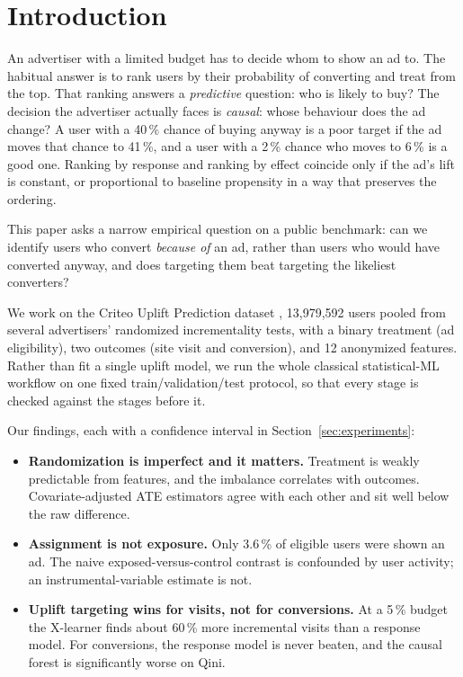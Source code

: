 \section{Introduction}

An advertiser with a limited budget has to decide whom to show an ad to. The
habitual answer is to rank users by their probability of converting and
treat from the top. That ranking answers a \emph{predictive} question: who is
likely to buy? The decision the advertiser actually faces is \emph{causal}:
whose behaviour does the ad change? A user with a 40\,\% chance of buying
anyway is a poor target if the ad moves that chance to 41\,\%, and a user
with a 2\,\% chance who moves to 6\,\% is a good one. Ranking by response and
ranking by effect coincide only if the ad's lift is constant, or
proportional to baseline propensity in a way that preserves the ordering.

This paper asks a narrow empirical question on a public benchmark: can we
identify users who convert \emph{because of} an ad, rather than users who
would have converted anyway, and does targeting them beat targeting the
likeliest converters?

We work on the Criteo Uplift Prediction dataset \cite{diemert2021}, 13,979,592
users pooled from several advertisers' randomized incrementality tests, with
a binary treatment (ad eligibility), two outcomes (site visit and
conversion), and 12 anonymized features. Rather than fit a single uplift
model, we run the whole classical statistical-ML workflow on one fixed
train/validation/test protocol, so that every stage is checked against the
stages before it.

Our findings, each with a confidence interval in Section~\ref{sec:experiments}:
\begin{itemize}
  \item \textbf{Randomization is imperfect and it matters.} Treatment is
        weakly predictable from features, and the imbalance correlates with
        outcomes. Covariate-adjusted ATE estimators agree with each other
        and sit well below the raw difference.
  \item \textbf{Assignment is not exposure.} Only 3.6\,\% of eligible users
        were shown an ad. The naive exposed-versus-control contrast is
        confounded by user activity; an instrumental-variable estimate is
        not.
  \item \textbf{Uplift targeting wins for visits, not for conversions.} At a
        5\,\% budget the X-learner finds about 60\,\% more incremental visits
        than a response model. For conversions, the response model is never
        beaten, and the causal forest is significantly worse on Qini.
\end{itemize}

